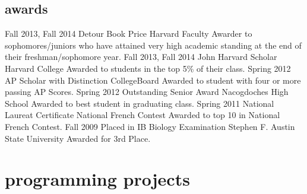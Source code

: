 \documentclass[]{friggeri-cv} %
\begin{document}
\begin{detailed}
\section{awards}

\begin{entrylist}
\entry
{Fall 2013, Fall 2014}
{Detour Book Price}
{Harvard Faculty}
{Awarder to sophomores/juniors who have attained very high academic standing at the end of their freshman/sophomore year.}
\entry
{Fall 2013, Fall 2014}
{John Harvard Scholar}
{Harvard College}
{Awarded to students in the top 5\% of their class.}
\entry
{Spring 2012}
{AP Scholar with Distinction}
{CollegeBoard}
{Awarded to student with four or more passing AP Scores.}
\entry
{Spring 2012}
{Outstanding Senior Award}
{Nacogdoches High School}
{Awarded to best student in graduating class.}
\entry
{Spring 2011}
{National Laureat Certificate}
{National French Contest}
{Awarded to top 10 in National French Contest.}
\entry
{Fall 2009}
{Placed in IB Biology Examination}
{Stephen F. Austin State University}
{Awarded for 3rd Place.}
\end{entrylist}
\end{detailed}



\section{programming projects}
\end{document}
